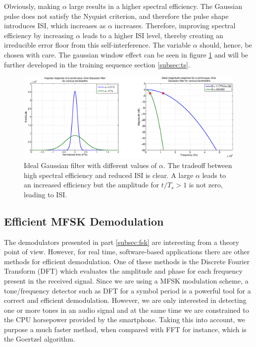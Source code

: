 \documentclass[12pt,a4paper,openright]{article}
\begin{document}
 Obviously, making $\alpha$ large results in a higher spectral efficiency. The Gaussian pulse does not satisfy the Nyquist criterion, and therefore the pulse shape introduces ISI, which increases as $\alpha$ increases. Therefore, improving spectral efficiency by increasing $\alpha$ leads to a higher ISI level, thereby creating an irreducible error floor from this self-interference. The variable $\alpha$ should, hence, be chosen with care. The gaussian window effect can be seen in figure \ref{fig:gaussianalpha} and will be further developed in the training sequence section \ref{subsec:ts}.

 \begin{figure}[h]
  \centering
    \includegraphics[width=1\textwidth]{gausswinalpha.eps}
    \caption{Ideal Gaussian filter with different values of $\alpha$. The tradeoff between high spectral efficiency and reduced ISI is clear. A large $\alpha$ leads to an increased efficiency but the amplitude for $t/T_s > 1$ is not zero, leading to ISI.}
    \label{fig:gaussianalpha}
\end{figure} 
 

\subsection{Efficient MFSK Demodulation}

The demodulators presented in part \ref{subsec:fsk} are interesting from a theory point of view. However, for real time, software-based applications there are other methods for efficient demodulation. One of these methods is the Discrete Fourier Transform (DFT) which evaluates the amplitude and phase for each frequency present in the received signal. Since we are using a MFSK modulation scheme, a tone/frequency detector such as DFT for a symbol period is a powerful tool for a correct and efficient demodulation. However, we are only interested in detecting one or more tones in an audio signal and at the same time we are constrained to the CPU horsepower provided by the smartphone. Taking this into account, we purpose a much faster method, when compared with FFT for instance, which is the Goertzel algorithm. 
\end{document}
